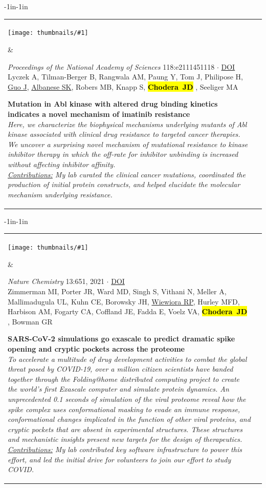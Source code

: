 \documentclass[10pt]{article}
\newcommand{\newarticle}[7]{
\begin{adjustwidth}{-1in}{-1in}  
\begin{tabular}{p{0.9in}p{7in}}
\parbox[c]{0.9in}{\texttt{[image: thumbnails/\#1]}} & \parbox[c]{6in}{\setstretch{0.9} {\small #4} $\cdot$ \href{#6}{#5} \\ {\footnotesize {#2}} \\ \raggedright { \bf\nohyphens{#3}}  \\ {\footnotesize\emph {#7}}} %
\end{tabular}
\end{adjustwidth}
\vspace{0.2in}
}
\newcommand{\jdc}{ {\bf \hl{Chodera~JD}} } %
\begin{document}
\newarticle{abl-mutant-kinetics}{Lyczek A, Tilman-Berger B, Rangwala AM, Paung Y, Tom J, Philipose H, \underline{Guo J}, \underline{Albanese SK}, Robers MB, Knapp S, \jdc, Seeliger MA}{Mutation in Abl kinase with altered drug binding kinetics indicates a novel mechanism of imatinib resistance}{\emph{Proceedings of the National Academy of Sciences} 118:e2111451118}{DOI}{https://doi.org/10.1073/pnas.2111451118, 2021}{Here, we characterize the biophysical mechanisms underlying mutants of Abl kinase associated with clinical drug resistance to targeted cancer therapies. 
We uncover a surprising novel mechanism of mutational resistance to kinase inhibitor therapy in which the off-rate for inhibitor unbinding is increased without affecting inhibitor affinity.\\
\underline{Contributions:} My lab curated the clinical cancer mutations, coordinated the production of initial protein constructs, and helped elucidate the molecular mechanism underlying resistance.}

\newarticle{foldingathome-covid-cryptic-pockets}{Zimmerman MI, Porter JR, Ward MD, Singh S, Vithani N, Meller A, Mallimadugula UL, Kuhn CE, Borowsky JH, \underline{Wiewiora RP}, Hurley MFD, Harbison AM, Fogarty CA, Coffland JE, Fadda E, Voelz VA, \jdc, Bowman GR}{SARS-CoV-2 simulations go exascale to predict dramatic spike opening and cryptic pockets across the proteome}{\emph{Nature Chemistry} 13:651, 2021}{DOI}{https://doi.org/10.1038/s41557-021-00707-0}{To accelerate a multitude of drug development activities to combat the global threat posed by COVID-19, over a million citizen scientists have banded together through the Folding@home distributed computing project to create the world’s first Exascale computer and simulate protein dynamics. 
An unprecedented 0.1 seconds of simulation of the viral proteome reveal how the spike complex uses conformational masking to evade an immune response, conformational changes implicated in the function of other viral proteins, and cryptic pockets that are absent in experimental structures. These structures and mechanistic insights present new targets for the design of therapeutics.\\
\underline{Contributions:} My lab contributed key software infrastructure to power this effort, and led the initial drive for volunteers to join our effort to study COVID.
}
\end{document}
